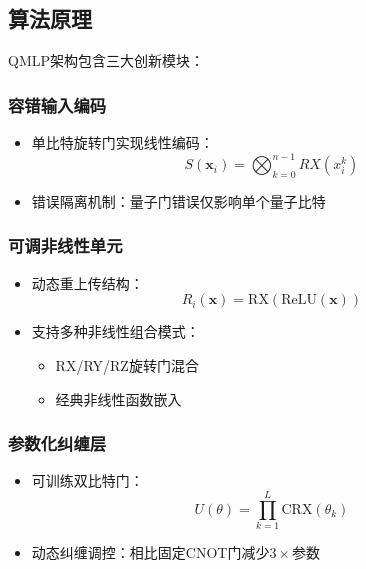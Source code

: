 \documentclass[10pt,a4paper,twoside]{article}
\numberwithin{figure}{section}%
\numberwithin{table}{section}%
\begin{document}
\subsection{算法原理}
QMLP架构包含三大创新模块：

\subsubsection{容错输入编码}
\begin{itemize}
    \item 单比特旋转门实现线性编码：
    \begin{equation}
        S(\mathbf{x}_i) = \bigotimes_{k=0}^{n-1} RX(x_i^k)
    \end{equation}
    
    \item 错误隔离机制：量子门错误仅影响单个量子比特
\end{itemize}

\subsubsection{可调非线性单元}
\begin{itemize}
    \item 动态重上传结构：
    \begin{equation}
        R_i(\mathbf{x}) = \text{RX}(\text{ReLU}(\mathbf{x}))
    \end{equation}
    
    \item 支持多种非线性组合模式：
    \begin{itemize}
        \item RX/RY/RZ旋转门混合
        \item 经典非线性函数嵌入
    \end{itemize}
\end{itemize}

\subsubsection{参数化纠缠层} 
\begin{itemize}
    \item 可训练双比特门：
    \begin{equation}
        U(\theta) = \prod_{k=1}^L \text{CRX}(\theta_k)
    \end{equation}
    
    \item 动态纠缠调控：相比固定CNOT门减少$3\times$参数
\end{itemize}
\end{document}
